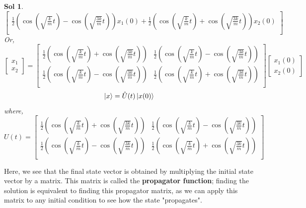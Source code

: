 \documentclass[12pt,a4paper]{report}
\newtheorem*{solution}{Sol}
\begin{document}
\begin{solution}
\begin{equation*}
\begin{bmatrix}
            \frac{1}{2}\left(\cos(\sqrt{\frac{k}{m}}t) - \cos(\sqrt{\frac{3k}{m}}t)\right)x_1(0) + \frac{1}{2}\left(\cos(\sqrt{\frac{k}{m}}t) + \cos(\sqrt{\frac{3k}{m}}t)\right)x_2(0) \\
        \end{bmatrix}
    \end{equation*}
    Or,
    \begin{equation*}
        \begin{bmatrix}
            x_1 \\
            x_2
        \end{bmatrix} = \begin{bmatrix}
            \frac{1}{2}\left(\cos(\sqrt{\frac{k}{m}}t) + \cos(\sqrt{\frac{3k}{m}}t)\right) & \frac{1}{2}\left(\cos(\sqrt{\frac{k}{m}}t) - \cos(\sqrt{\frac{3k}{m}}t)\right) \\
            \frac{1}{2}\left(\cos(\sqrt{\frac{k}{m}}t) - \cos(\sqrt{\frac{3k}{m}}t)\right) & \frac{1}{2}\left(\cos(\sqrt{\frac{k}{m}}t) + \cos(\sqrt{\frac{3k}{m}}t)\right) \\
        \end{bmatrix}
        \begin{bmatrix}
            x_1(0) \\ x_2(0)
        \end{bmatrix}
    \end{equation*}
    \begin{equation*}
        \ket{x} = \hat{U}(t)\ket{x(0)}
    \end{equation*}
    where,
    \begin{equation*}
        U(t) = \begin{bmatrix}
            \frac{1}{2}\left(\cos(\sqrt{\frac{k}{m}}t) + \cos(\sqrt{\frac{3k}{m}}t)\right) & \frac{1}{2}\left(\cos(\sqrt{\frac{k}{m}}t) - \cos(\sqrt{\frac{3k}{m}}t)\right) \\
            \frac{1}{2}\left(\cos(\sqrt{\frac{k}{m}}t) - \cos(\sqrt{\frac{3k}{m}}t)\right) & \frac{1}{2}\left(\cos(\sqrt{\frac{k}{m}}t) + \cos(\sqrt{\frac{3k}{m}}t)\right) \\
        \end{bmatrix}
    \end{equation*}
\end{solution}

Here, we see that the final state vector is obtained by multiplying the initial state vector by a matrix. This matrix is called the \textbf{propagator function}; finding the solution is equivalent to finding this propagator matrix, as we can apply this matrix to any initial condition to see how the state "propagates".
\end{document}
